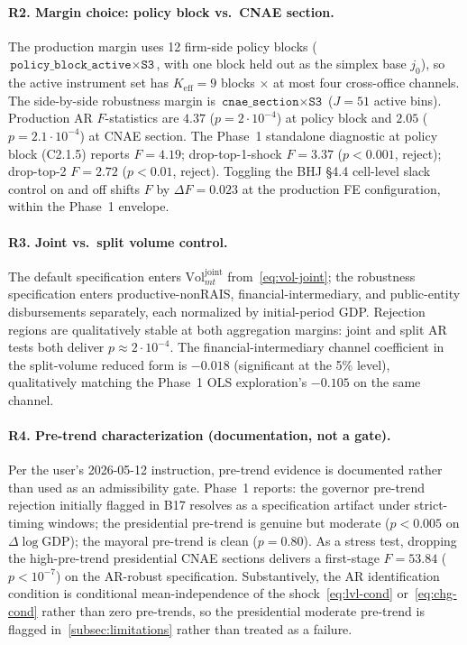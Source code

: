 \documentclass{article}
\newcommand{\Vol}{\mathrm{Vol}}
\theoremstyle{plain}
\theoremstyle{definition}
\theoremstyle{remark}
\begin{document}
\paragraph{R2. Margin choice: policy block vs.\ CNAE section.}
The production margin uses 12 firm-side policy blocks
($\texttt{policy\_block\_active}\times\texttt{S3}$, with one block held
out as the simplex base $j_0$), so the active instrument set has
$K_{\mathrm{eff}}=9$ blocks $\times$ at most four cross-office channels.
The side-by-side robustness margin is $\texttt{cnae\_section}\times\texttt{S3}$
($J=51$ active bins). Production AR $F$-statistics are $4.37$
($p=2{\cdot}10^{-4}$) at policy block and $2.05$ ($p=2.1{\cdot}10^{-4}$)
at CNAE section. The Phase~1 standalone diagnostic at policy block (C2.1.5)
reports $F=4.19$; drop-top-1-shock $F=3.37$ ($p<0.001$, reject); drop-top-2
$F=2.72$ ($p<0.01$, reject). Toggling the BHJ \S4.4 cell-level slack
control on and off shifts $F$ by $\Delta F=0.023$ at the production FE
configuration, within the Phase~1 envelope.

\paragraph{R3. Joint vs.\ split volume control.}
The default specification enters $\Vol^{\mathrm{joint}}_{mt}$ from~\eqref{eq:vol-joint};
the robustness specification enters productive-nonRAIS, financial-intermediary,
and public-entity disbursements separately, each normalized by initial-period
GDP. Rejection regions are qualitatively stable at both aggregation margins:
joint and split AR tests both deliver $p\approx 2{\cdot}10^{-4}$. The
financial-intermediary channel coefficient in the split-volume reduced form
is $-0.018$ (significant at the 5\% level), qualitatively matching the
Phase~1 OLS exploration's $-0.105$ on the same channel.

\paragraph{R4. Pre-trend characterization (documentation, not a gate).}
Per the user's 2026-05-12 instruction, pre-trend evidence is documented
rather than used as an admissibility gate. Phase~1 reports: the governor
pre-trend rejection initially flagged in B17 resolves as a specification
artifact under strict-timing windows; the presidential pre-trend is genuine
but moderate ($p<0.005$ on $\Delta\log\mathrm{GDP}$); the mayoral pre-trend
is clean ($p=0.80$). As a stress test, dropping the high-pre-trend
presidential CNAE sections delivers a first-stage $F=53.84$ ($p<10^{-7}$)
on the AR-robust specification. Substantively, the AR identification
condition is conditional mean-independence of the shock~\eqref{eq:lvl-cond}
or~\eqref{eq:chg-cond} rather than zero pre-trends, so the presidential
moderate pre-trend is flagged in~\autoref{subsec:limitations} rather than
treated as a failure.
\end{document}
